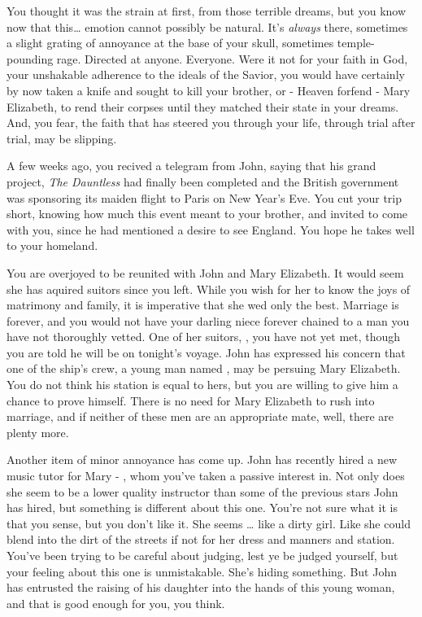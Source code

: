 \documentclass[char]{airship}
\begin{document}
You thought it was the strain at first, from those terrible dreams,
but you know now that this{\ldots} emotion cannot possibly be natural. It's
{\it always} there, sometimes a slight grating of annoyance at the
base of your skull, sometimes temple-pounding rage. Directed at
anyone. Everyone. Were it not for your faith in God, your unshakable
adherence to the ideals of the Savior, you would have certainly by now
taken a knife and sought to kill your brother, or - Heaven forfend -
Mary Elizabeth, to rend their corpses until they matched their state
in your dreams. And, you fear, the faith that has steered you through
your life, through trial after trial, may be slipping.

A few weeks ago, you recived a telegram from John, saying that his
grand project, {\it The Dauntless} had finally been completed and the
British government was sponsoring its maiden flight to Paris on New
Year's Eve. You cut your trip short, knowing how much this event meant
to your brother, and invited \cCowboy{} to come with you, since he had
mentioned a desire to see England. You hope he takes well to your
homeland.

You are overjoyed to be reunited with John and Mary Elizabeth. It
would seem she has aquired suitors since you left. While you wish for
her to know the joys of matrimony and family, it is imperative that
she wed only the best. Marriage is forever, and you would not have
your darling niece forever chained to a man you have not thoroughly
vetted. One of her suitors, \cDealer{\intro}, you have not yet met,
though you are told he will be on tonight's voyage. John has expressed
his concern that one of the ship's crew, a young man named
\cCid{\intro}, may be persuing Mary Elizabeth. You do not think his
station is equal to hers, but you are willing to give him a chance to
prove himself. There is no need for Mary Elizabeth to rush into
marriage, and if neither of these men are an appropriate mate, well,
there are plenty more.

Another item of minor annoyance has come up. John has recently hired a
new music tutor for Mary - \cWhore{\intro}, whom you've taken a
passive interest in. Not only does she seem to be a lower quality
instructor than some of the previous stars John has hired, but
something is different about this one. You're not sure what it is that
you sense, but you don't like it. She seems {\ldots} like a dirty
girl. Like she could blend into the dirt of the streets if not for her
dress and manners and station. You've been trying to be careful about
judging, lest ye be judged yourself, but your feeling about this one
is unmistakable. She's hiding something. But John has entrusted the
raising of his daughter into the hands of this young woman, and that
is good enough for you, you think.
\end{document}
